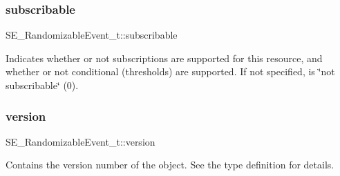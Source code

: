 \subsubsection{\texorpdfstring{subscribable}{subscribable}}
{\footnotesize\ttfamily S\+E\+\_\+\+Randomizable\+Event\+\_\+t\+::subscribable}

Indicates whether or not subscriptions are supported for this resource, and whether or not conditional (thresholds) are supported. If not specified, is \char`\"{}not subscribable\char`\"{} (0). \mbox{\label{group__RandomizableEvent_ga4aff0ff7df5bffb212069832a6e7387b}} 
\subsubsection{\texorpdfstring{version}{version}}
{\footnotesize\ttfamily S\+E\+\_\+\+Randomizable\+Event\+\_\+t\+::version}

Contains the version number of the object. See the type definition for details. 